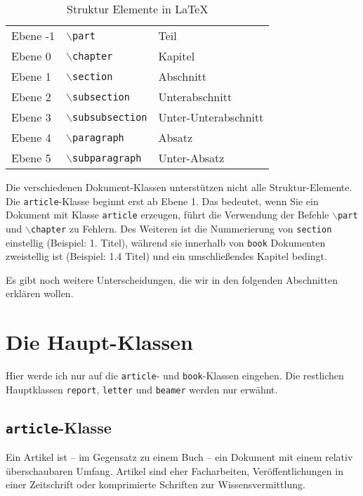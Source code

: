 \begin{table}[h]
\centering
\begin{tabular}{l|l|l}
Ebene -1 & \texttt{$\backslash$part} & Teil \\
Ebene 0 & \texttt{$\backslash$chapter} & Kapitel \\
Ebene 1 & \texttt{$\backslash$section} & Abschnitt \\
Ebene 2 & \texttt{$\backslash$subsection} & Unterabschnitt \\
Ebene 3 & \texttt{$\backslash$subsubsection} & Unter-Unterabschnitt \\
Ebene 4 & \texttt{$\backslash$paragraph} & Absatz \\
Ebene 5 & \texttt{$\backslash$subparagraph} & Unter-Absatz \\
\end{tabular}
\caption{Struktur Elemente in \LaTeX}
\label{tab:structure}
\end{table}

Die verschiedenen Dokument-Klassen unterstützen nicht alle Struktur-E\-le\-men\-te. Die \texttt{article}-Klasse beginnt erst ab Ebene 1. Das bedeutet, wenn Sie ein Dokument mit Klasse \texttt{article} erzeugen, führt die Verwendung der Befehle \texttt{$\backslash$part} und \texttt{$\backslash$chapter} zu Fehlern. Des Weiteren ist die Nummerierung von \texttt{section} einstellig (Beispiel: 1. Titel), während sie innerhalb von \texttt{book} Dokumenten zweistellig ist (Beispiel: 1.4 Titel) und ein umschließendes Kapitel bedingt. 

Es gibt noch weitere Unterscheidungen, die wir in den folgenden Abschnitten erklären wollen.

\section{Die Haupt-Klassen}

Hier werde ich nur auf die \texttt{article}- und \texttt{book}-Klassen eingehen. Die restlichen Hauptklassen \texttt{report}, \texttt{letter} und \texttt{beamer} werden nur erwähnt.

\subsection{\texttt{article}-Klasse}

Ein Artikel ist -- im Gegensatz zu einem Buch -- ein Dokument mit einem relativ überschaubaren Umfang. Artikel sind eher Facharbeiten, Veröffentlichungen in einer Zeitschrift oder komprimierte Schriften zur Wissensvermittlung. 

